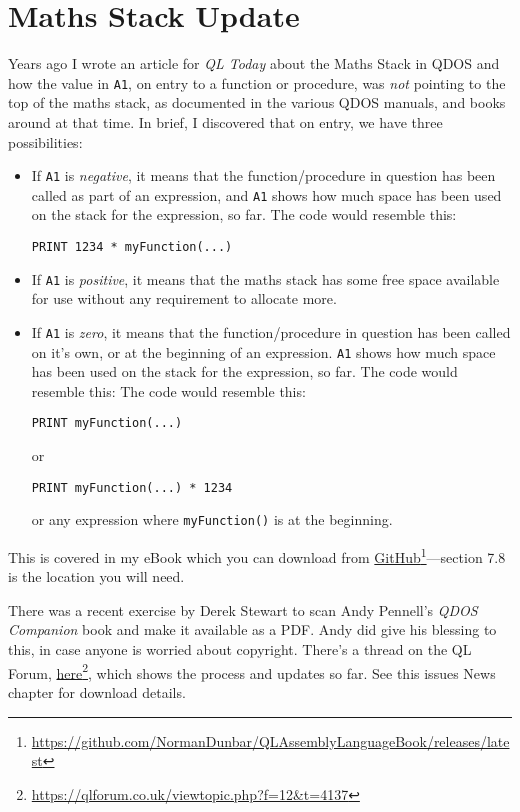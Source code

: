 
\chapter{Maths Stack Update}

Years ago I wrote an article for \emph{QL Today} about the Maths Stack
in QDOS and how the value in \texttt{A1}, on entry to a function or
procedure, was \emph{not} pointing to the top of the maths stack,
as documented in the various QDOS manuals, and books around at that
time. In brief, I discovered that on entry, we have three possibilities:
\begin{itemize}
\item If \texttt{A1} is \emph{negative}, it means that the function/procedure
in question has been called as part of an expression, and \texttt{A1}
shows how much space has been used on the stack for the expression,
so far. The code would resemble this: 
\begin{lstlisting}[basicstyle={\ttfamily},showstringspaces=false,tabsize=4]
PRINT 1234 * myFunction(...)
\end{lstlisting}
\item If \texttt{A1} is \emph{positive}, it means that the maths stack has
some free space available for use without any requirement to allocate
more. 
\item If \texttt{A1} is \emph{zero}, it means that the function/procedure
in question has been called on it's own, or at the beginning of an
expression. \texttt{A1} shows how much space has been used on the
stack for the expression, so far. The code would resemble this: The
code would resemble this: 
\begin{lstlisting}[basicstyle={\ttfamily},showstringspaces=false,tabsize=4]
PRINT myFunction(...)
\end{lstlisting}
 or 
\begin{lstlisting}[basicstyle={\ttfamily},showstringspaces=false,tabsize=4]
PRINT myFunction(...) * 1234
\end{lstlisting}
 or any expression where \lstinline[basicstyle={\ttfamily},showstringspaces=false,tabsize=4]!myFunction()!
is at the beginning.
\end{itemize}
This is covered in my eBook which you can download from \href{https://github.com/NormanDunbar/QLAssemblyLanguageBook/releases/latest}{GitHub}\footnote{\url{https://github.com/NormanDunbar/QLAssemblyLanguageBook/releases/latest}}---section 7.8 is the location you will need.

There was a recent exercise by Derek Stewart to scan Andy Pennell's
\emph{QDOS Companion} book and make it available as a PDF. Andy did
give his blessing to this, in case anyone is worried about copyright.
There's a thread on the QL Forum, \href{https://qlforum.co.uk/viewtopic.php?f=12&t=4137}{here}\footnote{\url{https://qlforum.co.uk/viewtopic.php?f=12\&t=4137}},
which shows the process and updates so far. See this issues News chapter
for download details.

